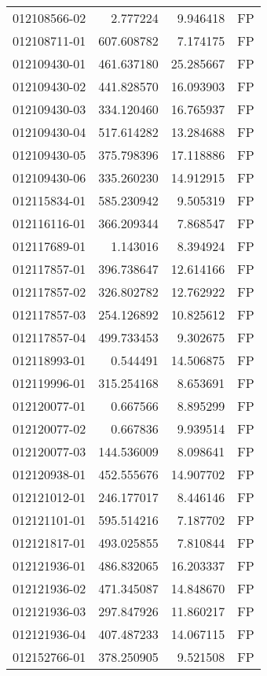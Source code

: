 \begin{tabular}{lrrl}
012108566-02 &    2.777224 &     9.946418 &   FP \\
012108711-01 &  607.608782 &     7.174175 &   FP \\
012109430-01 &  461.637180 &    25.285667 &   FP \\
012109430-02 &  441.828570 &    16.093903 &   FP \\
012109430-03 &  334.120460 &    16.765937 &   FP \\
012109430-04 &  517.614282 &    13.284688 &   FP \\
012109430-05 &  375.798396 &    17.118886 &   FP \\
012109430-06 &  335.260230 &    14.912915 &   FP \\
012115834-01 &  585.230942 &     9.505319 &   FP \\
012116116-01 &  366.209344 &     7.868547 &   FP \\
012117689-01 &    1.143016 &     8.394924 &   FP \\
012117857-01 &  396.738647 &    12.614166 &   FP \\
012117857-02 &  326.802782 &    12.762922 &   FP \\
012117857-03 &  254.126892 &    10.825612 &   FP \\
012117857-04 &  499.733453 &     9.302675 &   FP \\
012118993-01 &    0.544491 &    14.506875 &   FP \\
012119996-01 &  315.254168 &     8.653691 &   FP \\
012120077-01 &    0.667566 &     8.895299 &   FP \\
012120077-02 &    0.667836 &     9.939514 &   FP \\
012120077-03 &  144.536009 &     8.098641 &   FP \\
012120938-01 &  452.555676 &    14.907702 &   FP \\
012121012-01 &  246.177017 &     8.446146 &   FP \\
012121101-01 &  595.514216 &     7.187702 &   FP \\
012121817-01 &  493.025855 &     7.810844 &   FP \\
012121936-01 &  486.832065 &    16.203337 &   FP \\
012121936-02 &  471.345087 &    14.848670 &   FP \\
012121936-03 &  297.847926 &    11.860217 &   FP \\
012121936-04 &  407.487233 &    14.067115 &   FP \\
012152766-01 &  378.250905 &     9.521508 &   FP \\

\end{tabular}
